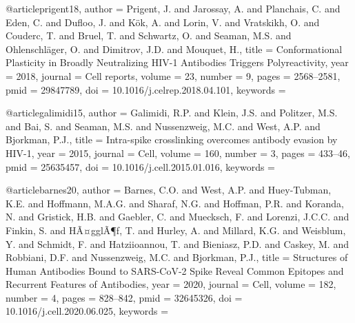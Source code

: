 @article{prigent18,
  author = {Prigent, J. and Jarossay, A. and Planchais, C. and Eden, C. and Dufloo, J. and K\"ok, A. and Lorin, V. and Vratskikh, O. and Couderc, T. and Bruel, T. and Schwartz, O. and Seaman, M.S. and Ohlenschl\"ager, O. and Dimitrov, J.D. and Mouquet, H.},
  title = {Conformational Plasticity in Broadly Neutralizing HIV-1 Antibodies Triggers Polyreactivity},
  year = 2018,
  journal = {Cell reports},
  volume = 23,
  number = 9,
  pages = {2568--2581},
  pmid = 29847789,
  doi = {10.1016/j.celrep.2018.04.101},
  keywords = {}
}

@article{galimidi15,
  author = {Galimidi, R.P. and Klein, J.S. and Politzer, M.S. and Bai, S. and Seaman, M.S. and Nussenzweig, M.C. and West, A.P. and Bjorkman, P.J.},
  title = {Intra-spike crosslinking overcomes antibody evasion by HIV-1},
  year = 2015,
  journal = {Cell},
  volume = 160,
  number = 3,
  pages = {433--46},
  pmid = 25635457,
  doi = {10.1016/j.cell.2015.01.016},
  keywords = {}
}

@article{barnes20,
  author = {Barnes, C.O. and West, A.P. and Huey-Tubman, K.E. and Hoffmann, M.A.G. and Sharaf, N.G. and Hoffman, P.R. and Koranda, N. and Gristick, H.B. and Gaebler, C. and Muecksch, F. and Lorenzi, J.C.C. and Finkin, S. and HÃ¤gglÃ¶f, T. and Hurley, A. and Millard, K.G. and Weisblum, Y. and Schmidt, F. and Hatziioannou, T. and Bieniasz, P.D. and Caskey, M. and Robbiani, D.F. and Nussenzweig, M.C. and Bjorkman, P.J.},
  title = {Structures of Human Antibodies Bound to SARS-CoV-2 Spike Reveal Common Epitopes and Recurrent Features of Antibodies},
  year = 2020,
  journal = {Cell},
  volume = 182,
  number = 4,
  pages = {828--842},
  pmid = 32645326,
  doi = {10.1016/j.cell.2020.06.025},
  keywords = {}
}


